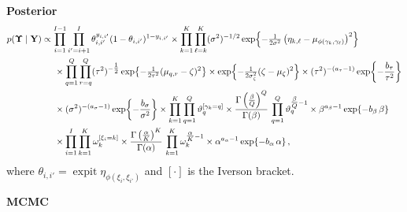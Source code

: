 \documentclass[letterpaper,12pt,openany]{article}
\def\exp#1{{\rm exp}{#1}}
\def\frac#1#2{{{#1}\over{#2}}}
\DeclareMathOperator*{\expit}{expit}
\newcommand{\ex}[1]{\exp{ \left\{ #1 \right\}}}
\def\Y{\mathbf{Y}}\def\y{\mathbf{y}}\def\Yv{\boldsymbol{Y}}\def\yv{\boldsymbol{y}}
\def\al{\alpha}\def\alv{\boldsymbol{\alpha}}
\def\ga{\gamma}\def\gav{\boldsymbol{\gamma}}
\def\sig{\sigma}\def\sigv{\boldsymbol{\sigma}}
\def\ome{\omega}
\begin{document}
\textbf{Posterior}
\begin{align*}
p(\UPS\mid\Y)
&\propto\prod_{i=1}^{I-1}\prod_{i'=i+1}^{I} \theta_{i,i'}^{y_{i,i'}}(1-\theta_{i,i'})^{1-y_{i,i'}} 
\times \prod_{k=1}^K\prod_{\ell=k}^K (\sigma^2)^{-1/2}\,\ex{-\tfrac{1}{2\sigma^2}\left(\eta_{k,\ell} - \mu_{\phi(\ga_k,\ga_\ell)}\right)^2} \\
&\hspace{0.5cm} \times \prod_{q=1}^{Q}\prod_{r=q}^{Q}(\tau^2)^{-\tfrac12}\,\ex{-\tfrac{1}{2\tau^2}(\mu_{q,r}-\zeta)^2}
\times \ex{-\tfrac{1}{2\sigma^2_\zeta}(\zeta-\mu_\zeta)^2}
\times (\tau^2)^{-(a_\tau-1)}\,\ex{-\frac{b_\tau}{\tau^2}}\\
&\hspace{0.5cm} \times (\sigma^2)^{-(a_\sig-1)}\,\ex{-\frac{b_\sig}{\sigma^2}} 
\times \prod_{k=1}^K\prod_{q=1}^Q\vartheta_q^{[\gamma_k=q]} 
\times \frac{\Gamma\left(\tfrac{\beta}{Q}\right)^Q}{\Gamma(\beta)}\,\prod_{q=1}^Q \vartheta_q^{\tfrac{\beta}{Q}-1} 
\times \beta^{a_\beta-1}\,\ex{-b_\beta\,\beta} \\
&\hspace{0.5cm} \times \prod_{i=1}^I\prod_{k=1}^K\omega_k^{[\xi_i=k]}
\times \frac{\Gamma\left(\tfrac{\al}{K}\right)^K}{\Gamma(\alpha)}\,\prod_{k=1}^K \ome_k^{\tfrac{\al}{K}-1}
\times \alpha^{a_\al-1}\,\ex{-b_\al\,\al}\,, \\
\end{align*}
where $\theta_{i,i'}=\expit\eta_{\phi(\xi_i,\xi_{i'})}$ and $[\cdot]$ is the Iverson bracket.

\textbf{MCMC}
\end{document}
